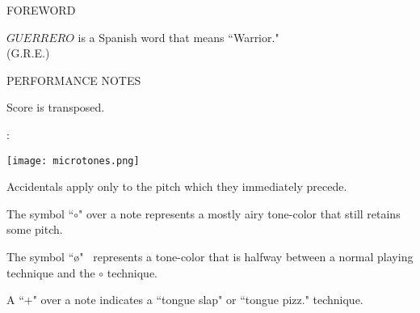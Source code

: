 \documentclass[10pt]{article}
\begin{document}
\begin{center}
\huge FOREWORD
\end{center}

\begin{center}
$GUERRERO$ is a Spanish word that means ``Warrior."\\
\phantom{text} \hfill (G.R.E.)
  \end{center}
  
\vspace*{4\baselineskip}

\begin{center}
\huge PERFORMANCE NOTES
\end{center}

\begin{center}
Score is transposed.
\end{center}

\begin{center}
:
\end{center}

\begin{center}
\texttt{[image: microtones.png]}
\end{center}

\begin{center}
Accidentals apply only to the pitch which they immediately precede.
\end{center}

\begin{center}
The symbol ``$\circ$" over a note represents a mostly airy tone-color that still retains some pitch.
\end{center}

\begin{center}
The symbol ``\o" \ represents a tone-color that is halfway between a normal playing technique and the $\circ$ technique.
\end{center}

\begin{center}
A ``$+$" over a note indicates a ``tongue slap" or ``tongue pizz." technique.
\end{center}

\vspace*{2\baselineskip}
\end{document}
